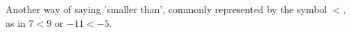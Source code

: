 Another way of saying 'smaller than', commonly represented by the symbol $<$, as in $7 < 9$ or $-11 < -5$.